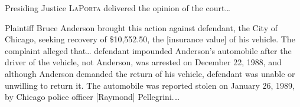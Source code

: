 
\opinion Presiding Justice \textsc{LaPorta} delivered the opinion of the
court\ldots


Plaintiff
Bruce Anderson
brought this action against defendant, the City of Chicago,
seeking recovery of \$10,552.50, the [insurance value]
of his
vehicle. The complaint alleged that\ldots
defendant impounded Anderson's
automobile after the driver of the vehicle, not Anderson, was arrested on
December 22, 1988, and although Anderson demanded the return of his vehicle,
defendant was unable or unwilling to return it. The automobile was reported
stolen on January 26, 1989, by Chicago police officer [Raymond]
Pellegrini.\ldots


